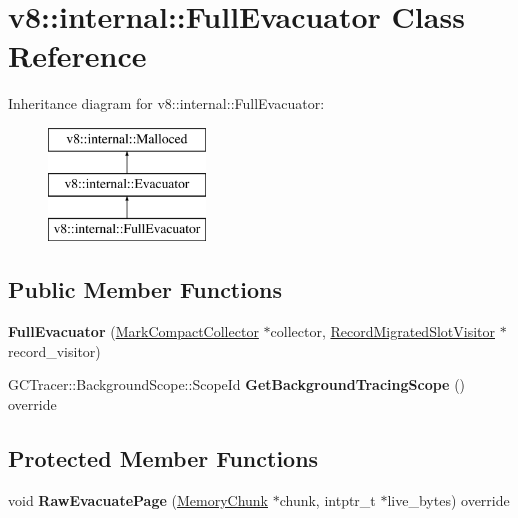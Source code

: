 \hypertarget{classv8_1_1internal_1_1FullEvacuator}{}\section{v8\+:\+:internal\+:\+:Full\+Evacuator Class Reference}
\label{classv8_1_1internal_1_1FullEvacuator}
Inheritance diagram for v8\+:\+:internal\+:\+:Full\+Evacuator\+:\begin{figure}[H]
\begin{center}
\leavevmode
\includegraphics[height=3.000000cm]{classv8_1_1internal_1_1FullEvacuator}
\end{center}
\end{figure}
\subsection*{Public Member Functions}
\begin{DoxyCompactItemize}
\item 
\mbox{\label{classv8_1_1internal_1_1FullEvacuator_ac08d0d47d2cfce351b9fb75521332b9d}} 
{\bfseries Full\+Evacuator} (\mbox{\hyperlink{classv8_1_1internal_1_1MarkCompactCollector}{Mark\+Compact\+Collector}} $\ast$collector, \mbox{\hyperlink{classv8_1_1internal_1_1RecordMigratedSlotVisitor}{Record\+Migrated\+Slot\+Visitor}} $\ast$record\+\_\+visitor)
\item 
\mbox{\label{classv8_1_1internal_1_1FullEvacuator_a6d0053ec5ec96d2a402b203dd8460a20}} 
G\+C\+Tracer\+::\+Background\+Scope\+::\+Scope\+Id {\bfseries Get\+Background\+Tracing\+Scope} () override
\end{DoxyCompactItemize}
\subsection*{Protected Member Functions}
\begin{DoxyCompactItemize}
\item 
\mbox{\label{classv8_1_1internal_1_1FullEvacuator_abb412faeed60c4e11f886583ba7527cc}} 
void {\bfseries Raw\+Evacuate\+Page} (\mbox{\hyperlink{classv8_1_1internal_1_1MemoryChunk}{Memory\+Chunk}} $\ast$chunk, intptr\+\_\+t $\ast$live\+\_\+bytes) override
\end{DoxyCompactItemize}
